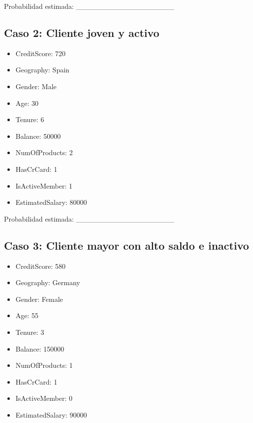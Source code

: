 \documentclass[
]{article}
\providecommand{\tightlist}{%
  \setlength{\itemsep}{0pt}\setlength{\parskip}{0pt}}
\begin{document}
Probabilidad estimada: \_\_\_\_\_\_\_\_\_\_\_\_\_\_\_\_\_\_\_

\subsection{Caso 2: Cliente joven y
activo}\label{caso-2-cliente-joven-y-activo}

\begin{itemize}
\tightlist
\item
  CreditScore: 720\\
\item
  Geography: Spain\\
\item
  Gender: Male\\
\item
  Age: 30\\
\item
  Tenure: 6\\
\item
  Balance: 50000\\
\item
  NumOfProducts: 2\\
\item
  HasCrCard: 1\\
\item
  IsActiveMember: 1\\
\item
  EstimatedSalary: 80000
\end{itemize}

Probabilidad estimada: \_\_\_\_\_\_\_\_\_\_\_\_\_\_\_\_\_\_\_

\subsection{Caso 3: Cliente mayor con alto saldo e
inactivo}\label{caso-3-cliente-mayor-con-alto-saldo-e-inactivo}

\begin{itemize}
\tightlist
\item
  CreditScore: 580\\
\item
  Geography: Germany\\
\item
  Gender: Female\\
\item
  Age: 55\\
\item
  Tenure: 3\\
\item
  Balance: 150000\\
\item
  NumOfProducts: 1\\
\item
  HasCrCard: 1\\
\item
  IsActiveMember: 0\\
\item
  EstimatedSalary: 90000
\end{itemize}
\end{document}
